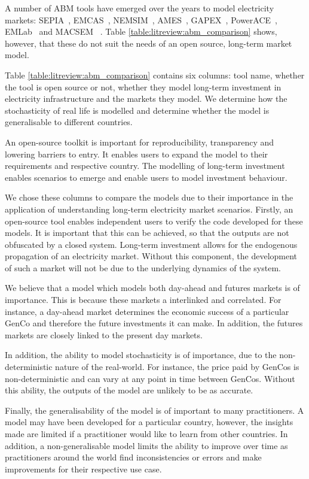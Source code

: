 A number of ABM tools have emerged over the years to model electricity markets: SEPIA~\cite{Harp2000}, EMCAS~\cite{Conzelmann}, NEMSIM~\cite{Batten2006}, AMES~\cite{Sun2007}, GAPEX~\cite{Cincotti2013}, PowerACE~\cite{Rothengatter2007}, EMLab~\cite{Chappin2017} and MACSEM ~\cite{Praca2003}. Table \ref{table:litreview:abm_comparison} shows, however, that these do not suit the needs of an open source, long-term market model. 


Table \ref{table:litreview:abm_comparison} contains six columns: tool name, whether the tool is open source or not, whether they model long-term investment in electricity infrastructure and the markets they model. We determine how the stochasticity of real life is modelled and determine whether the model is generalisable to different countries. 

An open-source toolkit is important for reproducibility, transparency and lowering barriers to entry. It enables users to expand the model to their requirements and respective country. The modelling of long-term investment enables scenarios to emerge and enable users to model investment behaviour. 

We chose these columns to compare the models due to their importance in the application of understanding long-term electricity market scenarios. Firstly, an open-source tool enables independent users to verify the code developed for these models. It is important that this can be achieved, so that the outputs are not obfuscated by a closed system. Long-term investment allows for the endogenous propagation of an electricity market. Without this component, the development of such a market will not be due to the underlying dynamics of the system.

We believe that a model which models both day-ahead and futures markets is of importance. This is because these markets a interlinked and correlated. For instance, a day-ahead market determines the economic success of a particular GenCo and therefore the future investments it can make. In addition, the futures markets are closely linked to the present day markets.

In addition, the ability to model stochasticity is of importance, due to the non-deterministic nature of the real-world. For instance, the price paid by GenCos is non-deterministic and can vary at any point in time between GenCos. Without this ability, the outputs of the model are unlikely to be as accurate. 

Finally, the generalisability of the model is of important to many practitioners. A model may have been developed for a particular country, however, the insights made are limited if a practitioner would like to learn from other countries. In addition, a non-generalisable model limits the ability to improve over time as practitioners around the world find inconsistencies or errors and make improvements for their respective use case.

